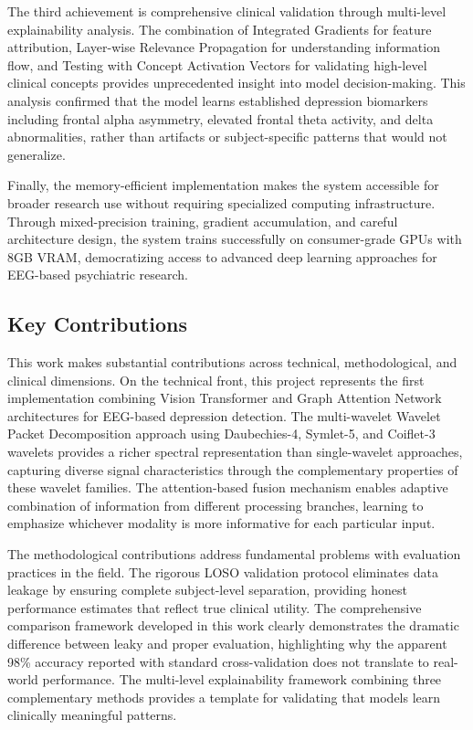 The third achievement is comprehensive clinical validation through multi-level explainability analysis. The combination of Integrated Gradients for feature attribution, Layer-wise Relevance Propagation for understanding information flow, and Testing with Concept Activation Vectors for validating high-level clinical concepts provides unprecedented insight into model decision-making. This analysis confirmed that the model learns established depression biomarkers including frontal alpha asymmetry, elevated frontal theta activity, and delta abnormalities, rather than artifacts or subject-specific patterns that would not generalize.

Finally, the memory-efficient implementation makes the system accessible for broader research use without requiring specialized computing infrastructure. Through mixed-precision training, gradient accumulation, and careful architecture design, the system trains successfully on consumer-grade GPUs with 8GB VRAM, democratizing access to advanced deep learning approaches for EEG-based psychiatric research.

\subsection{Key Contributions}

This work makes substantial contributions across technical, methodological, and clinical dimensions. On the technical front, this project represents the first implementation combining Vision Transformer and Graph Attention Network architectures for EEG-based depression detection. The multi-wavelet Wavelet Packet Decomposition approach using Daubechies-4, Symlet-5, and Coiflet-3 wavelets provides a richer spectral representation than single-wavelet approaches, capturing diverse signal characteristics through the complementary properties of these wavelet families. The attention-based fusion mechanism enables adaptive combination of information from different processing branches, learning to emphasize whichever modality is more informative for each particular input.

The methodological contributions address fundamental problems with evaluation practices in the field. The rigorous LOSO validation protocol eliminates data leakage by ensuring complete subject-level separation, providing honest performance estimates that reflect true clinical utility. The comprehensive comparison framework developed in this work clearly demonstrates the dramatic difference between leaky and proper evaluation, highlighting why the apparent 98\% accuracy reported with standard cross-validation does not translate to real-world performance. The multi-level explainability framework combining three complementary methods provides a template for validating that models learn clinically meaningful patterns.

